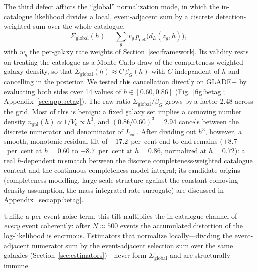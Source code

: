 The third defect afflicts the ``global'' normalization mode, in which the in-catalogue likelihood divides a local, event-adjacent sum by a discrete detection-weighted sum over the whole catalogue,
\begin{equation}
  \Sigma_{\mathrm{global}}(h) = \sum_{g} w_g\, p_{\mathrm{det}}\big(d_L(z_g,h)\big),
  \label{eq:pitfall:sigmaglobal}
\end{equation}
with $w_g$ the per-galaxy rate weights of Section~\ref{sec:framework}. Its validity rests on treating the catalogue as a Monte Carlo draw of the completeness-weighted galaxy density, so that $\Sigma_{\mathrm{global}}(h) \approx C\,\beta_G(h)$ with $C$ independent of $h$ and cancelling in the posterior. We tested this cancellation directly on GLADE+ \citep{Dalya:2021ewn} by evaluating both sides over 14 values of $h \in [0.60, 0.86]$ (Fig.~\ref{fig:betag}; Appendix~\ref{sec:app:betag}). %
The raw ratio $\Sigma_{\mathrm{global}}/\beta_G$ grows by a factor 2.48 across the grid. %
Most of this is benign: a fixed galaxy set implies a comoving number density $n_{\mathrm{gal}}(h) \propto 1/V_{\mathrm{c}} \propto h^3$, and $(0.86/0.60)^3 = 2.94$ cancels between the discrete numerator and denominator of $L_{\mathrm{cat}}$. %
After dividing out $h^3$, however, a smooth, monotonic residual tilt of $-17.2$~per~cent end-to-end remains ($+8.7$~per~cent at $h=0.60$ to $-8.7$~per~cent at $h=0.86$, normalized at $h=0.72$): %
a real $h$-dependent mismatch between the discrete completeness-weighted catalogue content and the continuous completeness-model integral; its candidate origins (completeness modelling, large-scale structure against the constant-comoving-density assumption, the mass-integrated rate surrogate) are discussed in Appendix~\ref{sec:app:betag}. %

Unlike a per-event noise term, this tilt multiplies the in-catalogue channel of \emph{every} event coherently: after $N \approx 500$ events the accumulated distortion of the log-likelihood is enormous. %
Estimators that normalize locally---dividing the event-adjacent numerator sum by the event-adjacent selection sum over the same galaxies (Section~\ref{sec:estimators})---never form $\Sigma_{\mathrm{global}}$ and are structurally immune.

